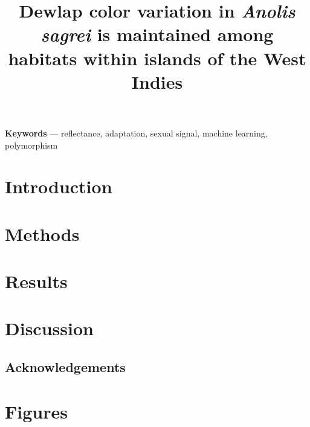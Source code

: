 \documentclass{article}
\title{Dewlap color variation in \textit{Anolis sagrei} is maintained among habitats within islands of the West Indies}
\begin{document}
	
	\linenumbers
	
	\maketitle
	
	\begin{abstract}
		
	\end{abstract}
	
	\textbf{Keywords} --- reflectance, adaptation, sexual signal, machine learning, polymorphism
	
	\section*{Introduction}
	
	
	
	\pagebreak
	
	\section*{Methods}
	
	
	
	\pagebreak
	
	\section*{Results}
	
	
	
	\pagebreak
	
	\section*{Discussion}
	
	
	
	\pagebreak
	
	\subsection*{Acknowledgements}
	
	
	
	\pagebreak
	
	\section*{Figures}
	
	
	
\end{document}
